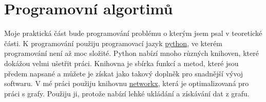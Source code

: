 \chapter{Programovní algortimů}
\label{chap:programovani}

Moje praktická část bude programování problému o kterým jsem psal v teoretické části. K programování použiju programovací jazyk \href{https://www.python.org/}{python}, ve kterém programování není až moc složité. Python nabízí mnoho různých knihoven, které dokážou velmi ušetřit práci. Knihovna je sbírka funkcí a metod, které jsou předem napsané a můžete je získat jako takový doplněk pro snadnější vývoj softwaru. V mé práci použiju knihovnu \href{https://networkx.org/}{networkx}, která je optimalizovaná pro práci s grafy. Použiju ji, protože nabízí lehké ukládání a získávání dat z grafu.


